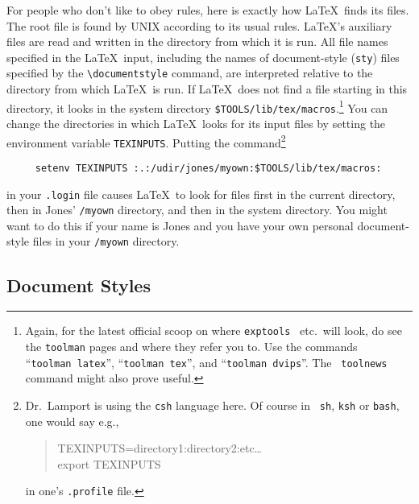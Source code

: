 For people who don't like to obey rules,
here is exactly how \LaTeX\ finds its
files.  The root file is found by UNIX according to its usual rules.
\LaTeX's auxiliary files are read and written in the directory from
which it is run.  All file names specified in the \LaTeX\ input,
including the names of document-style ({\tt sty}) files specified by
the \hbox{\verb|\documentstyle|} command, are interpreted relative to
the directory from which \LaTeX\ is run.  If \LaTeX\ does not find a
file starting in this directory, it looks in the system directory
\hbox{\verb|$TOOLS/lib/tex/macros|}.\footnote{
Again, for the latest official scoop on where {\tt exptools}
\LittleLaTeX\ etc.\ will look,
do see the {\tt toolman} pages and where they refer you to.  Use the
commands ``{\tt toolman~latex}'',
``{\tt toolman~tex}'', and ``{\tt toolman~dvips}''.  The {\tt
toolnews} command might also prove useful.}  You can change the
directories in which \LaTeX\ looks for its input files by setting the
environment
variable \mbox{\tt TEXINPUTS}.  Putting the command\footnote{
Dr.~Lamport is using the {\tt csh} language here.  Of course in {\tt
sh}, {\tt ksh} or {\tt bash}, one would say e.g.,
\begin{quote}
\begin{tt}
TEXINPUTS=directory1:directory2:etc\ldots\\
export TEXINPUTS
\end{tt}
\end{quote}
in one's {\tt .profile} file.
}
\begin{verbatim}
     setenv TEXINPUTS :.:/udir/jones/myown:$TOOLS/lib/tex/macros:
\end{verbatim}
in your \mbox{\tt .login} file causes \LaTeX\ to look for files first
in the current directory, then in Jones' {\tt /myown} directory, and
then in the system directory.  You might want to do this if your name
is Jones and you have your own personal document-style files in your
{\tt /myown} directory.

\subsection{Document Styles}


